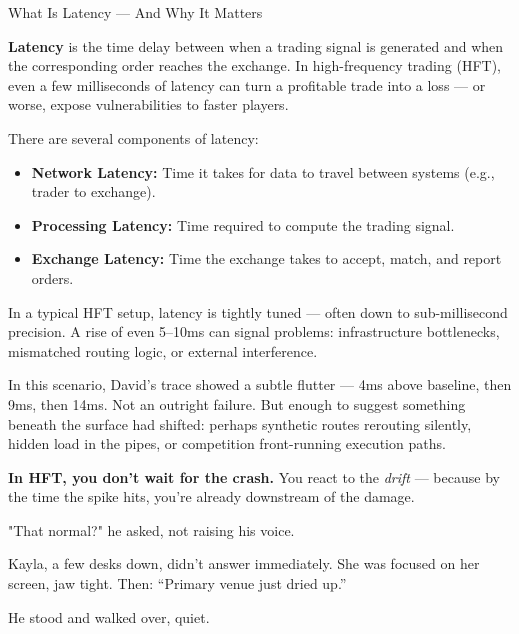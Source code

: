 \begin{TechnicalSidebar}{What Is Latency — And Why It Matters}

  \textbf{Latency} is the time delay between when a trading signal is generated and when the corresponding order reaches the exchange.  
  In high-frequency trading (HFT), even a few milliseconds of latency can turn a profitable trade into a loss — or worse, expose vulnerabilities to faster players.
  
  \medskip
  
  There are several components of latency:
  \begin{itemize}
    \item \textbf{Network Latency:} Time it takes for data to travel between systems (e.g., trader to exchange).
    \item \textbf{Processing Latency:} Time required to compute the trading signal.
    \item \textbf{Exchange Latency:} Time the exchange takes to accept, match, and report orders.
  \end{itemize}
  
  \medskip
  
  In a typical HFT setup, latency is tightly tuned — often down to sub-millisecond precision.  
  A rise of even 5–10ms can signal problems: infrastructure bottlenecks, mismatched routing logic, or external interference.
  
  \medskip
  
  In this scenario, David’s trace showed a subtle flutter — 4ms above baseline, then 9ms, then 14ms.  
  Not an outright failure. But enough to suggest something beneath the surface had shifted:  
  perhaps synthetic routes rerouting silently, hidden load in the pipes, or competition front-running execution paths.
  
  \medskip
  
  \textbf{In HFT, you don’t wait for the crash.}  
  You react to the \textit{drift} — because by the time the spike hits, you’re already downstream of the damage.
  
\end{TechnicalSidebar}

\medskip

"That normal?" he asked, not raising his voice.

Kayla, a few desks down, didn’t answer immediately. She was focused on her screen, jaw tight. Then:
“Primary venue just dried up.”

He stood and walked over, quiet.

